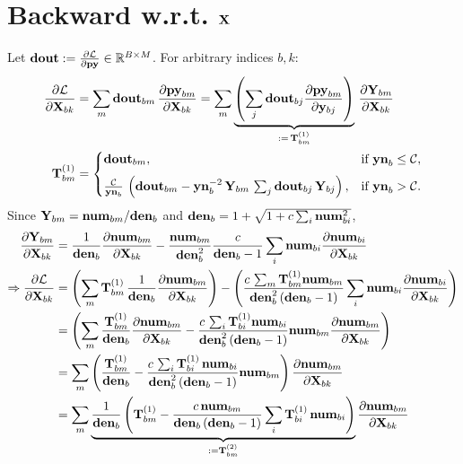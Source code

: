 \documentclass{article}
\begin{document}

\section{Backward w.r.t. $\v{X}$}

Let $\v{dout}:=\ddfrac{\mathcal{L}}{\v{py}}\in\mathbb{R}^{B\times M}$. For arbitrary indices $b,k$:
\begin{align}
\ddfrac{\mathcal{L}}{\v{X}{bk}}
&= \sum_m \v{dout}{bm}\,\ddfrac{\v{py}{bm}}{\v{X}{bk}}
= \sum_m \underbrace{\left( \sum_j \v{dout}{bj} \ddfrac{\v{py}{bm}}{\v{y}{bj}} \right)}_{:=\,\T{1}{bm}} \,\ddfrac{\v{Y}{bm}}{\v{X}{bk}} \\
\T{1}{bm} &=
\begin{cases}
  \v{dout}{bm}, & \text{if } \v{yn}_b \le \mathcal{C}, \\[6pt]
  \frac{\mathcal{C}}{\v{yn}{b}}\,\left(\v{dout}{bm} - \v{yn}{b}^{-2}\,\v{Y}{bm}\,\sum_j \v{dout}{bj}\,\v{Y}{bj}\right),
    & \text{if } \v{yn}_b > \mathcal{C}.
\end{cases} \\
\end{align}
Since $\v{Y}{bm}=\v{num}{bm}/\v{den}{b}$ and $\v{den}{b} = 1+\sqrt{1+c\sum_i \v{num}{bi}^2}$,
\begin{align}
\ddfrac{\v{Y}{bm}}{\v{X}{bk}}
&= \frac{1}{\v{den}{b}}\ddfrac{\v{num}{bm}}{\v{X}{bk}} - \frac{\v{num}{bm}}{\v{den}{b}^2}\frac{c}{\v{den}{b}-1}\sum_i \v{num}{bi}\ddfrac{\v{num}{bi}}{\v{X}{bk}} \\
\Rightarrow \ddfrac{\mathcal{L}}{\v{X}{bk}} &= \left( \sum_m \T{1}{bm}\,\frac{1}{\v{den}{b}}\ddfrac{\v{num}{bm}}{\v{X}{bk}} \right) - \left( \frac{c\,\sum_m \T{1}{bm} \v{num}{bm}}{\v{den}{b}^2\,(\v{den}{b}-1)}\sum_i \v{num}{bi}\ddfrac{\v{num}{bi}}{\v{X}{bk}} \right) \\
&= \left( \sum_m \frac{\T{1}{bm}}{\v{den}{b}}\ddfrac{\v{num}{bm}}{\v{X}{bk}} - \frac{c\,\sum_i \T{1}{bi} \v{num}{bi}}{\v{den}{b}^2\,(\v{den}{b}-1)} \v{num}{bm}\ddfrac{\v{num}{bm}}{\v{X}{bk}} \right) \\
&= \sum_m \left( \frac{\T{1}{bm}}{\v{den}{b}} - \frac{c\,\sum_i \T{1}{bi}\, \v{num}{bi}}{\v{den}{b}^2\,(\v{den}{b}-1)} \v{num}{bm} \right) \ddfrac{\v{num}{bm}}{\v{X}{bk}}  \\
&= \sum_m \underbrace{\frac{1}{\v{den}{b}} \left(\T{1}{bm} - \frac{c\,\v{num}{bm}}{\v{den}{b}\,(\v{den}{b}-1)} \sum_i \T{1}{bi}\, \v{num}{bi}  \right)}_{:=\T{2}{bm}} \ddfrac{\v{num}{bm}}{\v{X}{bk}}  \\
\end{align}
\end{document}
